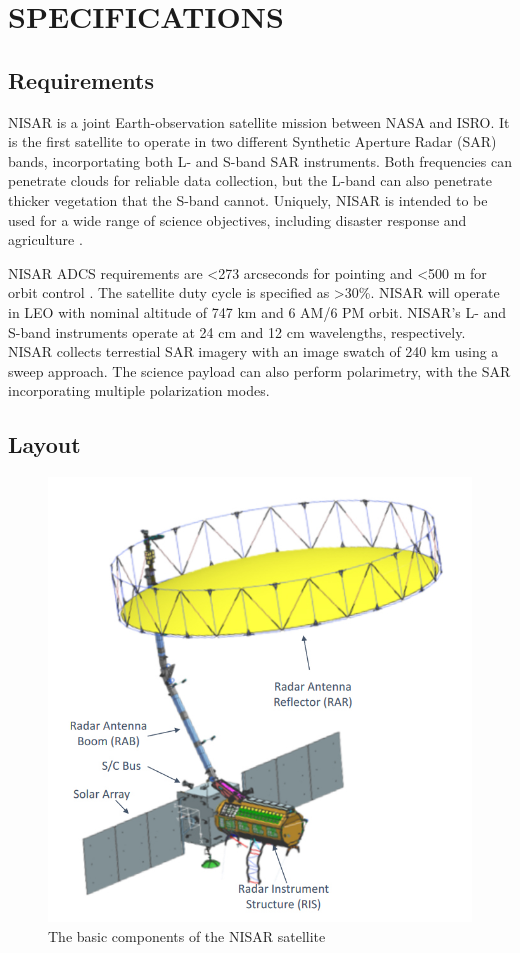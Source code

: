 \section{\Large SPECIFICATIONS}
\subsection{Requirements}
NISAR is a joint Earth-observation satellite mission between NASA and ISRO. It is the first satellite to operate in two different Synthetic Aperture Radar (SAR) bands, incorportating both L- and S-band SAR instruments. Both frequencies can penetrate clouds for reliable data collection, but the L-band can also penetrate thicker vegetation that the S-band cannot. Uniquely, NISAR is intended to be used for a wide range of science objectives, including disaster response and agriculture \cite{NISARApps}.

NISAR ADCS requirements are \textless 273 arcseconds for pointing and \textless 500 m for orbit control \cite{Siqueira}. The satellite duty cycle is specified as \textgreater 30\%. NISAR will operate in LEO with nominal altitude of 747 km and 6 AM/6 PM orbit. NISAR's L- and S-band instruments operate at 24 cm and 12 cm wavelengths, respectively. NISAR collects terrestial SAR imagery with an image swatch of 240 km using a sweep approach. The science payload can also perform polarimetry, with the SAR incorporating multiple polarization modes.

\subsection{Layout}
\begin{figure}[H]
\centering
\includegraphics[scale=0.38]{Images/nisar_diagram.jpg}
\caption{The basic components of the NISAR satellite}
\label{NISAR Diagram}
\end{figure}

